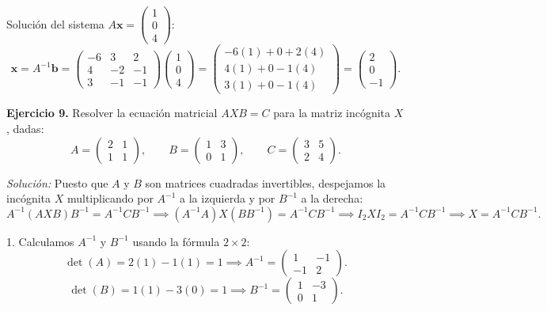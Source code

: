 \documentclass[11pt,letterpaper]{article}
\theoremstyle{definition}
\theoremstyle{plain}
\newcommand{\vv}[1]{\mathbf{#1}}
\begin{document}
Solución del sistema $A\vv{x} = \begin{pmatrix} 1 \\ 0 \\ 4 \end{pmatrix}$:
\[
\vv{x} = A^{-1} \vv{b} = \begin{pmatrix} -6 & 3 & 2 \\ 4 & -2 & -1 \\ 3 & -1 & -1 \end{pmatrix} \begin{pmatrix} 1 \\ 0 \\ 4 \end{pmatrix} = \begin{pmatrix} -6(1) + 0 + 2(4) \\ 4(1) + 0 - 1(4) \\ 3(1) + 0 - 1(4) \end{pmatrix} = \begin{pmatrix} 2 \\ 0 \\ -1 \end{pmatrix}.
\]

\vspace{0.3cm}
\textbf{Ejercicio 9.} Resolver la ecuación matricial $A X B = C$ para la matriz incógnita $X$, dadas:
\[
A = \begin{pmatrix} 2 & 1 \\ 1 & 1 \end{pmatrix}, \qquad B = \begin{pmatrix} 1 & 3 \\ 0 & 1 \end{pmatrix}, \qquad C = \begin{pmatrix} 3 & 5 \\ 2 & 4 \end{pmatrix}.
\]

\emph{Solución:}
Puesto que $A$ y $B$ son matrices cuadradas invertibles, despejamos la incógnita $X$ multiplicando por $A^{-1}$ a la izquierda y por $B^{-1}$ a la derecha:
\[
A^{-1} (A X B) B^{-1} = A^{-1} C B^{-1} \implies (A^{-1} A) X (B B^{-1}) = A^{-1} C B^{-1} \implies I_2 X I_2 = A^{-1} C B^{-1} \implies X = A^{-1} C B^{-1}.
\]

1. Calculamos $A^{-1}$ y $B^{-1}$ usando la fórmula $2\times 2$:
\[
\det(A) = 2(1) - 1(1) = 1 \implies A^{-1} = \begin{pmatrix} 1 & -1 \\ -1 & 2 \end{pmatrix}.
\]
\[
\det(B) = 1(1) - 3(0) = 1 \implies B^{-1} = \begin{pmatrix} 1 & -3 \\ 0 & 1 \end{pmatrix}.
\]
\end{document}
